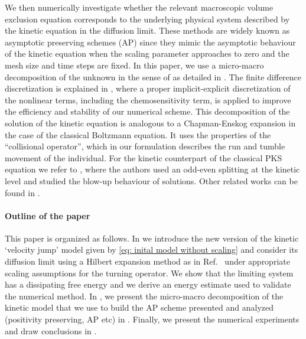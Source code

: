 \documentclass[review,onefignum,onetabnum]{siamart220329}
\begin{document}
We then numerically investigate whether the relevant macroscopic volume exclusion equation corresponds to the underlying physical system described by the kinetic equation { in the diffusion limit}. These methods are widely known as asymptotic preserving schemes (AP) \cite{filbet2010class,jin1999efficient} since they mimic the asymptotic behaviour of the kinetic equation when the scaling parameter approaches to zero and the mesh size and time steps are fixed. In this paper, we use a micro-macro decomposition of the unknown in the sense of  \cite{LemouMieussens} as detailed in . {The finite difference discretization is explained in , where a proper implicit-explicit discretization of the nonlinear terms, including the chemosensitivity term, is applied to improve the efficiency and stability of our numerical scheme.} This decomposition of the solution of the kinetic equation is analogous to a Chapman-Enskog expansion in the case of the classical Boltzmann equation. It uses the properties of the ``collisional operator'', which in our formulation describes the run and tumble movement of the individual. For the kinetic counterpart of the classical PKS equation we refer to \cite{carrillo2013asymptotic}, where the authors used an odd-even splitting at the kinetic level and studied { the blow-up behaviour of solutions.}
Other related works can be found in \cite{emako2016well,wang2019asymptotic,jin2011class,chertock2019high}. 

\paragraph{Outline of the paper} This paper is organized as follows. In  we {introduce the new version of the kinetic `velocity jump' model given by \cref{eq: inital model without scaling}} and consider its diffusion limit using a Hilbert expansion method as in Ref.~\cite{othmer2002diffusion} under appropriate scaling assumptions for the turning operator. We show that the limiting system has a dissipating free energy and we derive an energy estimate used to validate the numerical method. { In , we present the micro-macro decomposition of the kinetic model that we use to build the AP scheme presented and analyzed (positivity preserving, AP etc) in .} Finally, we present the numerical experiments and draw conclusions in . 
\end{document}
